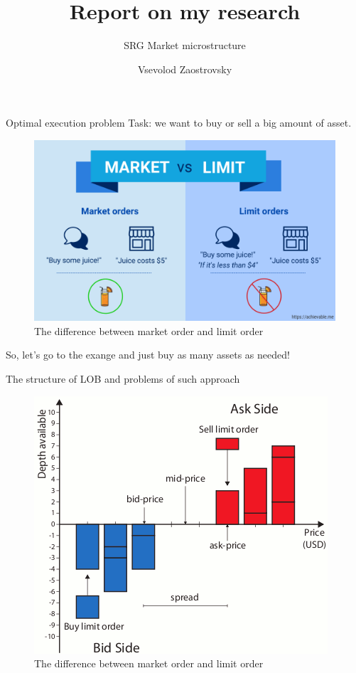 \documentclass[aspectratio=169]{beamer}
\title{Report on my research}
\subtitle{SRG Market microstructure}
\author{Vsevolod Zaostrovsky}
\institute{Vega Institute Foundation}
\begin{document}
\maketitle

\begin{frame}{Optimal execution problem}
    Task: we want to buy or sell a big amount of asset. \par
    \begin{figure}
        \includegraphics[scale=0.23]{figs/market-vs-limit-1024x614.png}
        \caption{The difference between market order and limit order}
        \label{fig:mvslim}
    \end{figure}
    So, let's go to the exange and just buy as many assets as needed!

\end{frame}

\begin{frame}{The structure of LOB and problems of such approach}
    \begin{figure}
        \includegraphics[scale=0.45]{figs/Graphical-representation-of-the-Limit-Order-Book.png}
        \caption{The difference between market order and limit order}
        \label{fig:mvslim}
    \end{figure}

\end{frame}
\end{document}
